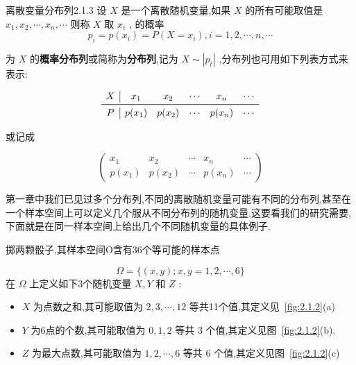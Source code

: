 \begin{definition}{离散变量分布列}{2.1.3}
	设 $ X $ 是一个离散随机变量,如果 $ X $ 的所有可能取值是 $ x_1,x_{2}, \cdots, x_{n}, \cdots $ 则称 $ X $ 取 $ x_i $ , 的概率
	\begin{equation} 
	p_{i}=p\left(x_{i}\right)=P\left(X=x_{i}\right), i=1,2, \cdots, n, \cdots \label{eq:2.1.2}
	\end{equation}
	
	为 $ X $ 的\textbf{概率分布列}或简称为\textbf{分布列},记为 $ X \sim\left|p_{t}\right| $ ,分布列也可用如下列表方式来表示:
	
	\[
	\begin{array}{c|ccccc}
	X	&    x_{1}     &    x_{2}     &    \cdots     &     x_{n}    &   \cdots \\\midrule
	P	&    p(x_1)     &    p(x_2)     &    \cdots     &    p(x_n)     &   \cdots \\
	\end{array}
	\]
	
	
	或记成
	
	\[ 
	\left( \begin{array}{ccccc}{x_{1}} & {x_{2}} & {\cdots} & {x_{n}} & {\cdots} \\ {p\left(x_{1}\right)} & {p\left(x_{2}\right)} & {\cdots} & {p\left(x_{n}\right)} & {\cdots}\end{array}\right)
	\]
	
\end{definition}


第一章中我们已见过多个分布列,不同的离散随机变量可能有不同的分布列,甚至在一个样本空间上可以定义几个服从不同分布列的随机变量,这要看我们的研究需要,下面就是在同一样本空间上给出几个不同随机变量的具体例子.
\begin{example}\label{exam:2.1.3}
	掷两颗骰子,其样本空间O含有36个等可能的样本点
	
	\[ 
	\Omega=\{(x, y) ; x, y=1,2, \cdots, 6\}
	\]
	在 $ \Omega $ 上定义如下3个随机变量 $ X,Y $ 和 $ Z $ :
	\begin{itemize}
		\item $ X $ 为点数之和,其可能取值为 $ 2,3, \cdots, 12 $ 等共11个值,其定义见~\ref{fig:2.1.2}(a)
		\item $ Y $ 为6点的个数,其可能取值为 $ 0,1,2 $ 等共 $ 3 $ 个值,其定义见图~\ref{fig:2.1.2}(b).
		\item $ Z $ 为最大点数,其可能取值为 $ 1,2, \cdots, 6 $ 等共 $ 6 $ 个值,其定义见图~\ref{fig:2.1.2}(c)
	\end{itemize}
\end{example}


